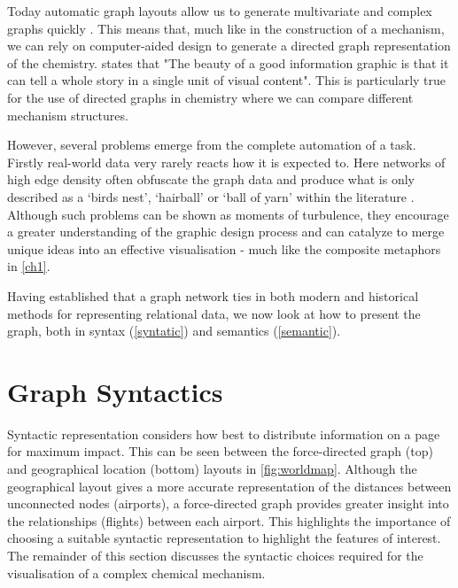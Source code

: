 Today automatic graph layouts allow us to generate multivariate and complex graphs quickly \citep{ch3}. This means that, much like in the construction of a mechanism, we can rely on computer-aided design to generate a directed graph representation of the chemistry. \cite{sciamerican} states that "The beauty of a good information graphic is that it can tell a whole story in a single unit of visual content". This is particularly true for the use of directed graphs in chemistry where we can compare different mechanism structures.

However, several problems emerge from the complete automation of a task. Firstly real-world data very rarely reacts how it is expected to. Here networks of high edge density often obfuscate the graph data and produce what is only described as a `birds nest', `hairball' or `ball of yarn' within the literature \citep{ch7}. Although such problems can be shown as moments of turbulence, they encourage a greater understanding of the graphic design process and can catalyze to merge unique ideas into an effective visualisation \citep{goodideas} - much like the composite metaphors in \autoref{ch1}.


Having established that a graph network ties in both modern and historical methods for representing relational data, we now look at how to present the graph, both in syntax (\autoref{syntatic}) and semantics (\autoref{semantic}).



\section{Graph Syntactics}\label{syntatic}

 Syntactic representation considers how best to distribute information on a page for maximum impact. This can be seen between the force-directed graph (top) and geographical location (bottom) layouts in \autoref{fig:worldmap}. Although the geographical layout gives a more accurate representation of the distances between unconnected nodes (airports), a force-directed graph provides greater insight into the relationships (flights) between each airport. This highlights the importance of choosing a suitable syntactic representation to highlight the features of interest. The remainder of this section discusses the syntactic choices required for the visualisation of a complex chemical mechanism.



